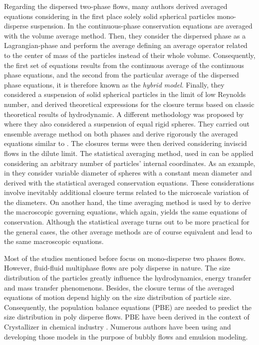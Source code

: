 Regarding the dispersed two-phase flows, many authors derived averaged equations considering in the first place solely solid spherical particles mono-disperse suspension.
In \citet{jackson1997locally,anderson1967fluid} the continuous-phase conservation equations are averaged with the volume average method.
Then, they consider the dispersed phase as a Lagrangian-phase and perform the average defining an average operator related to the center of mass of the particles instead of their whole volume. 
Consequently, the first set of equations results from the continuous average of the continuous phase equations, and the second from the particular average of the dispersed phase equations, it is therefore known as the \textit{hybrid model}.  
Finally, they considered a suspension of solid spherical particles in the limit of low Reynolds number, and derived theoretical expressions for the closure terms based on classic theoretical results of hydrodynamic.
A different methodology was proposed by \citet{zhang1994averaged} where they also considered a suspension of equal rigid spheres.
They carried out ensemble average method on both phases and derive rigorously the averaged equations similar to \citet{jackson1997locally}.
The closures terms were then derived considering inviscid flows in the dilute limit. 
The statistical averaging method, used in \citet{zhang1994averaged} can  be applied considering an arbitrary number of particles' internal coordinates.  
As an example, in \citet{zhang1994ensemble} they consider variable diameter of spheres with a constant mean diameter and derived with the statistical averaged conservation equations. 
These considerations involve inevitably additional closure terms related to the microscale variation of the diameters.
On another hand, the time averaging method is used by \citet{ishii2010thermo} to derive the macroscopic governing equations, which again, yields the same equations of conservation. 
Although the statistical average turns out to be more practical for the general cases, the other average methods are of course equivalent and lead to the same macroscopic equations. 

Most of the studies mentioned before focus on mono-disperse two phases flows. 
However, fluid-fluid multiphase flows are poly disperse in nature.  
The size distribution of the particles greatly influence the hydrodynamics, energy transfer and mass transfer phenomenons.
Besides, the closure terms of the averaged equations of motion depend highly on the size distribution of particle size. 
Consequently, the population balance equations (PBE) are needed to predict the size distribution in poly disperse flows.
PBE have been derived in the context of Crystallizer in chemical industry \citep{randolph2012theory}.
Numerous authors \citep{marchisio2013computational,fox2022hyperbolic,morel2015mathematical} have been using  and developing those models in the purpose of bubbly flows and emulsion modeling. 

